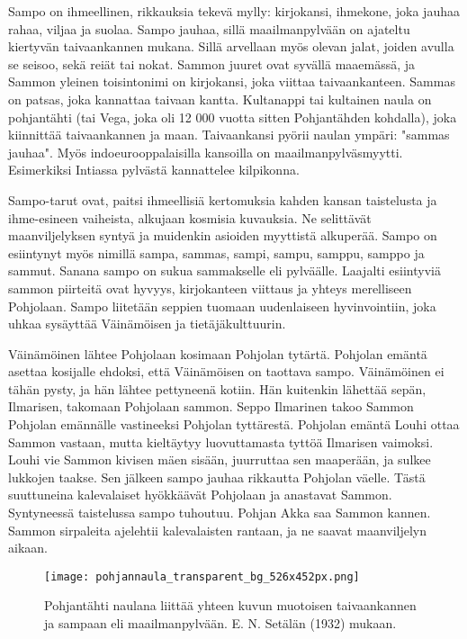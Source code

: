   Sampo on ihmeellinen, rikkauksia tekevä mylly: kirjokansi, ihmekone, joka jauhaa rahaa, viljaa ja
  suolaa. Sampo jauhaa, sillä maailmanpylvään on ajateltu kiertyvän taivaankannen mukana. Sillä
  arvellaan myös olevan jalat, joiden avulla se seisoo, sekä reiät tai nokat. Sammon juuret ovat
  syvällä maaemässä, ja Sammon yleinen toisintonimi on kirjokansi, joka viittaa taivaankanteen.
  Sammas on patsas, joka kannattaa taivaan kantta. Kultanappi tai kultainen naula on pohjantähti
  (tai Vega, joka oli 12 000 vuotta sitten Pohjantähden kohdalla), joka kiinnittää taivaankannen
  ja maan. Taivaankansi pyörii naulan ympäri: "sammas jauhaa". Myös indoeurooppalaisilla kansoilla
  on maailmanpylväsmyytti. Esimerkiksi Intiassa pylvästä kannattelee kilpikonna. \par
  Sampo-tarut ovat, paitsi ihmeellisiä kertomuksia kahden kansan taistelusta ja ihme-esineen
  vaiheista, alkujaan kosmisia kuvauksia. Ne selittävät maanviljelyksen syntyä ja muidenkin
  asioiden myyttistä alkuperää. Sampo on esiintynyt myös nimillä sampa, sammas, sampi, sampu,
  samppu, samppo ja sammut. Sanana sampo on sukua sammakselle eli pylväälle. Laajalti esiintyviä
  sammon piirteitä ovat hyvyys, kirjokanteen viittaus ja yhteys merelliseen Pohjolaan. Sampo
  liitetään seppien tuomaan uudenlaiseen hyvinvointiin, joka uhkaa sysäyttää Väinämöisen ja
  tietäjäkulttuurin. \par
  Väinämöinen lähtee Pohjolaan kosimaan Pohjolan tytärtä. Pohjolan emäntä a\-settaa kosijalle
  ehdoksi, että Väinämöisen on taottava sampo. Väinämöinen ei tähän pysty, ja hän lähtee pettyneenä
  kotiin. Hän kuitenkin lähettää sepän, Ilmarisen, takomaan Pohjolaan sammon. Seppo Ilmarinen takoo
  Sammon Pohjolan emännälle vastineeksi Pohjolan tyttärestä. Pohjolan emäntä Louhi ottaa Sammon
  vastaan, mutta kieltäytyy luovuttamasta tyttöä Ilmarisen vaimoksi. Louhi vie Sammon kivisen mäen
  sisään, juurruttaa sen maaperään, ja sulkee lukkojen taakse. Sen jälkeen sampo jauhaa rikkautta
  Pohjolan väelle. Tästä suuttuneina kalevalaiset hyökkäävät Pohjolaan ja anastavat Sammon.
  Syntyneessä taistelussa sampo tuhoutuu. Pohjan Akka saa Sammon kannen. Sammon sirpaleita
  ajelehtii kalevalaisten rantaan, ja ne saavat maanviljelyn aikaan.

  \begin{figure}[!hb]%
    \centering%
    \texttt{[image: pohjannaula\_transparent\_bg\_526x452px.png]}%
    \caption{Pohjantähti naulana liittää yhteen kuvun muotoisen taivaankannen ja sampaan eli maailmanpylvään. E. N. Setälän (1932) mukaan.}%
  \end{figure}



